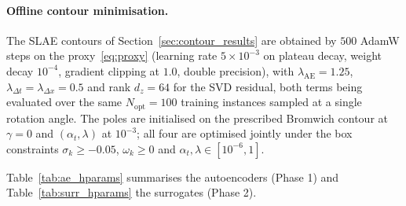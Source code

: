 ﻿\documentclass[a4paper,12pt]{article}
\theoremstyle{definition}
\theoremstyle{remark}
\begin{document}
\paragraph{Offline contour minimisation.}
The SLAE contours of Section~\ref{sec:contour_results} are obtained by $500$ AdamW steps on the proxy~\eqref{eq:proxy} (learning rate $5\times10^{-3}$ on plateau decay, weight decay $10^{-4}$, gradient clipping at $1.0$, double precision), with $\lambda_{\mathrm{AE}} = 1.25$, $\lambda_{\Delta t} = \lambda_{\Delta x} = 0.5$ and rank $d_z = 64$ for the SVD residual, both terms being evaluated over the same $N_{\mathrm{opt}} = 100$ training instances sampled at a single rotation angle. The poles are initialised on the prescribed Bromwich contour at $\gamma = 0$ and $(\alpha_t, \lambda)$ at $10^{-3}$; all four are optimised jointly under the box constraints $\sigma_k \geq -0.05$, $\omega_k \geq 0$ and $\alpha_t, \lambda \in [10^{-6}, 1]$.

Table~\ref{tab:ae_hparams} summarises the autoencoders (Phase 1) and Table~\ref{tab:surr_hparams} the surrogates (Phase 2).
\end{document}

